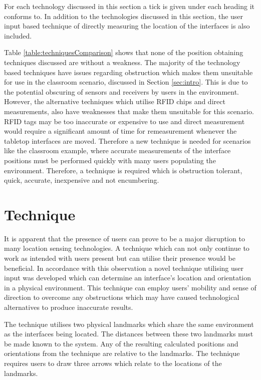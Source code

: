 \documentclass{bmcart}
\begin{document}
For each technology discussed in this section a tick is given under each heading it conforms to.
In addition to the technologies discussed in this section, the user input based technique of directly measuring the location of the interfaces is also included.

Table \ref{table:techniquesComparison} shows that none of the position obtaining techniques discussed are without a weakness.
The majority of the technology based techniques have issues regarding obstruction which makes them unsuitable for use in the classroom scenario, discussed in Section \ref{sec:intro}.
This is due to the potential obscuring of sensors and receivers by users in the environment.
However, the alternative techniques which utilise RFID chips and direct measurements, also have weaknesses that make them unsuitable for this scenario.
RFID tags may be too inaccurate or expensive to use and direct measurement would require a significant amount of time for remeasurement whenever the tabletop interfaces are moved.
Therefore a new technique is needed for scenarios like the classroom example, where accurate measurements of the interface positions must be performed quickly with many users populating the environment.
Therefore, a technique is required which is obstruction tolerant, quick, accurate, inexpensive and not encumbering.


\section*{Technique}\label{sec:technique}

It is apparent that the presence of users can prove to be a major disruption to many location sensing technologies.
A technique which can not only continue to work as intended with users present but can utilise their presence would be beneficial.
In accordance with this observation a novel technique utilising user input was developed which can determine an interface's location and orientation in a physical environment.
This technique can employ users' mobility and sense of direction to overcome any obstructions which may have caused technological alternatives to produce inaccurate results.

The technique utilises two physical landmarks which share the same environment as the interfaces being located.
The distances between these two landmarks must be made known to the system.
Any of the resulting calculated positions and orientations from the technique are relative to the landmarks.
The technique requires users to draw three arrows which relate to the locations of the landmarks.
\end{document}
